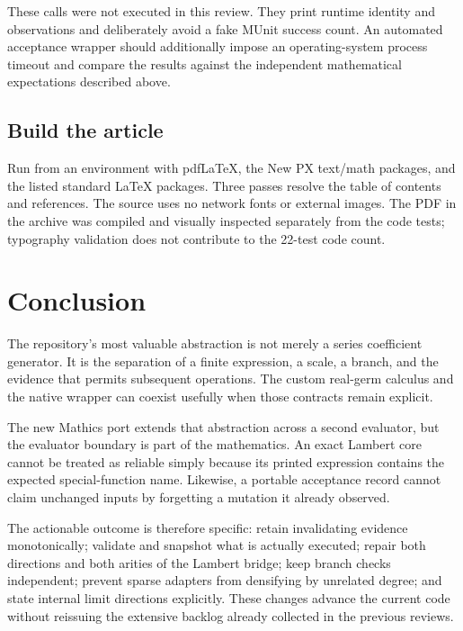 \documentclass[11pt,a4paper]{article}
\begin{document}
These calls were not executed in this review. They print runtime identity and observations and deliberately avoid a fake MUnit success count. An automated acceptance wrapper should additionally impose an operating-system process timeout and compare the results against the independent mathematical expectations described above.

\subsection{Build the article}
Run  from an environment with pdfLaTeX, the New PX text/math packages, and the listed standard LaTeX packages. Three passes resolve the table of contents and references. The source uses no network fonts or external images. The PDF in the archive was compiled and visually inspected separately from the code tests; typography validation does not contribute to the 22-test code count.

\section{Conclusion}
The repository's most valuable abstraction is not merely a series coefficient generator. It is the separation of a finite expression, a scale, a branch, and the evidence that permits subsequent operations. The custom real-germ calculus and the native wrapper can coexist usefully when those contracts remain explicit.

The new Mathics port extends that abstraction across a second evaluator, but the evaluator boundary is part of the mathematics. An exact Lambert core cannot be treated as reliable simply because its printed expression contains the expected special-function name. Likewise, a portable acceptance record cannot claim unchanged inputs by forgetting a mutation it already observed.

The actionable outcome is therefore specific: retain invalidating evidence monotonically; validate and snapshot what is actually executed; repair both directions and both arities of the Lambert bridge; keep branch checks independent; prevent sparse adapters from densifying by unrelated degree; and state internal limit directions explicitly. These changes advance the current code without reissuing the extensive backlog already collected in the previous reviews.

\appendix
\end{document}
